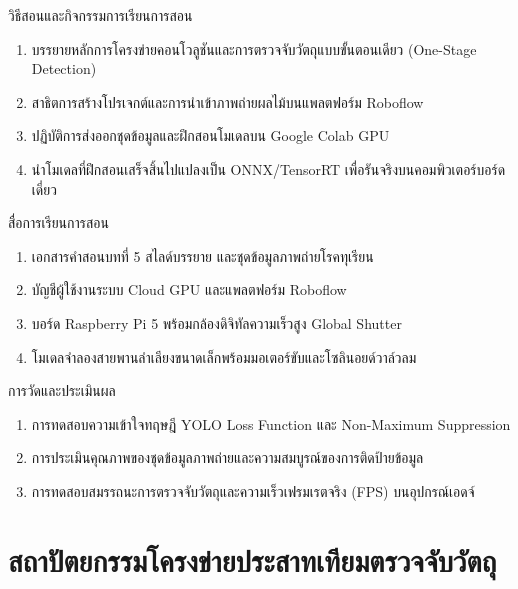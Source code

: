 \begin{planbox}{วิธีสอนและกิจกรรมการเรียนการสอน}
\begin{enumerate}[topsep=2pt, itemsep=1pt, partopsep=0pt, parsep=0pt, leftmargin=1.5em]
    \item บรรยายหลักการโครงข่ายคอนโวลูชันและการตรวจจับวัตถุแบบขั้นตอนเดียว (One-Stage Detection)
    \item สาธิตการสร้างโปรเจกต์และการนำเข้าภาพถ่ายผลไม้บนแพลตฟอร์ม Roboflow
    \item ปฏิบัติการส่งออกชุดข้อมูลและฝึกสอนโมเดลบน Google Colab GPU
    \item นำโมเดลที่ฝึกสอนเสร็จสิ้นไปแปลงเป็น ONNX/TensorRT เพื่อรันจริงบนคอมพิวเตอร์บอร์ดเดี่ยว
\end{enumerate}
\end{planbox}

\begin{planbox}{สื่อการเรียนการสอน}
\begin{enumerate}[topsep=2pt, itemsep=1pt, partopsep=0pt, parsep=0pt, leftmargin=1.5em]
    \item เอกสารคำสอนบทที่ 5 สไลด์บรรยาย และชุดข้อมูลภาพถ่ายโรคทุเรียน
    \item บัญชีผู้ใช้งานระบบ Cloud GPU และแพลตฟอร์ม Roboflow
    \item บอร์ด Raspberry Pi 5 พร้อมกล้องดิจิทัลความเร็วสูง Global Shutter
    \item โมเดลจำลองสายพานลำเลียงขนาดเล็กพร้อมมอเตอร์ขับและโซลินอยด์วาล์วลม
\end{enumerate}
\end{planbox}

\begin{planbox}{การวัดและประเมินผล}
\begin{enumerate}[topsep=2pt, itemsep=1pt, partopsep=0pt, parsep=0pt, leftmargin=1.5em]
    \item การทดสอบความเข้าใจทฤษฎี YOLO Loss Function และ Non-Maximum Suppression
    \item การประเมินคุณภาพของชุดข้อมูลภาพถ่ายและความสมบูรณ์ของการติดป้ายข้อมูล
    \item การทดสอบสมรรถนะการตรวจจับวัตถุและความเร็วเฟรมเรตจริง (FPS) บนอุปกรณ์เอดจ์
\end{enumerate}
\end{planbox}

\clearpage

\section{สถาปัตยกรรมโครงข่ายประสาทเทียมตรวจจับวัตถุ}

